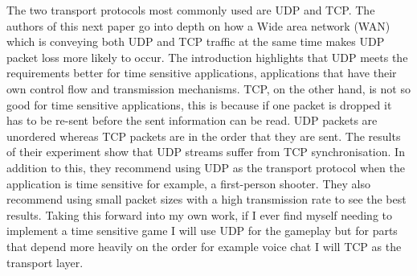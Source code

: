 \documentclass{scrartcl}
\begin{document}
The two transport protocols most commonly used are UDP and TCP\cite{bishop2005rigorous}. The authors of this next paper \cite {hidenari1997characteristics} go into depth on how a Wide area network (WAN) which is conveying both UDP and TCP traffic at the same time makes UDP packet loss more likely to occur. The introduction highlights that UDP meets the requirements better for time sensitive applications, applications that have their own control flow and transmission mechanisms. TCP, on the other hand, is not so good for time sensitive applications, this is because if one packet is dropped it has to be re-sent before the sent information can be read. UDP packets are unordered whereas TCP packets are in the order that they are sent. The results of their experiment show that UDP streams suffer from TCP synchronisation. In addition to this, they recommend using UDP as the transport protocol when the application is time sensitive for example, a first-person shooter. They also recommend using small packet sizes with a high transmission rate to see the best results. Taking this forward into my own work, if I ever find myself needing to implement a time sensitive game I will use UDP for the gameplay but for parts that depend more heavily on the order for example voice chat I will TCP as the transport layer. 




\end{document}

